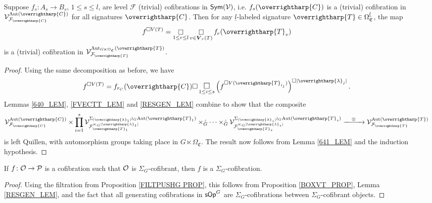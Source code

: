 \documentclass[a4paper,10pt
,draft
]{article}%
\renewcommand{\F}{\mathcal F}
\renewcommand{\1}{\eta}%
\newcommand{\vect}[1]{\text{\overrightharp{\ensuremath{#1}}}}
\begin{document}
\begin{proposition}
      \label{BOXVT_PROP}
      Suppose $f_s: A_s \to B_s$, $1 \leq s \leq l$, are level $\F$ (trivial) cofibrations in $\mathsf{Sym}(\mathcal V)$, i.e. $f_s(\vect C)$ is a (trivial) cofibration in $\V^{\Aut(\vect C)}_{\F_{\vect C}}$ for all signatures $\vect C$.
      Then for any $\underline{l}$-labeled signature $\vect T \in \Omega^{\underline{l}}_{\mathfrak C}$, the map
      \[
            f^{\square V(T)} = \mathop{\square}\limits_{1 \leq r \leq l} \mathop{\square}\limits_{v \in \boldsymbol{V}_r(T)} f_r(\vect T_v)
      \]
      is a (trivial) cofibration in $\V^{\Aut_{G \ltimes \Omega_{\mathfrak C}}(\vect T)}_{\F_{\vect T}}$.
\end{proposition}
\begin{proof}
      Using the same decomposition as before, we have
      \[
            f^{\square V(T)} = f_{r_C}(\vect C) \square \mathop{\mathlarger{\square}}\limits_{1 \leq i \leq s}\left(f^{\square V(\vect T_{i_j})}\right)^{\square |\vect \lambda_j|}.
      \]
      Lemmas \ref{640_LEM}, \ref{FVECTT_LEM} and \ref{RESGEN_LEM} combine to show that the composite
      \[
            \V^{\Aut(\vect C)}_{\F_{\vect C}} \times
            \prod_{i=1}^s
            \V^{\Sigma_{|\vect \lambda_1|} \wr_G \Aut(\vect T_1)}_{\F_{\vect T_1}^{\ltimes_G |\vect \lambda_1|}}
            \times_G^\lrcorner
            \dots
            \times_G^\lrcorner
            \V^{\Sigma_{|\vect \lambda_s|} \wr_G \Aut(\vect T_s)}_{\F_{\vect T_s}^{\ltimes_G |\vect \lambda_s|}}
            \xrightarrow{\quad \otimes \quad}
            \V^{\Aut(\vect T)}_{\F_{\vect T}}
      \]
      is left Quillen,
      with automorphism groups taking place in $G \ltimes \Omega_{\mathfrak C}$. 
      The result now follows from Lemma \ref{641_LEM} and the induction hypothesis.
\end{proof}


\begin{corollary}
      \label{SIGMAG_COF_COR}
      If $f \colon \mathcal{O} \to \mathcal{P}$ is a cofibration such that $\mathcal{O}$ is $\Sigma_G$-cofibrant, then $f$ is a $\Sigma_G$-cofibration.
\end{corollary}
\begin{proof}
      Using the filtration from Proposition \ref{FILTPUSHG PROP},
      this follows from Proposition \ref{BOXVT_PROP}, Lemma \ref{RESGEN_LEM}, and the fact that all generating cofibrations in $\mathsf{sOp}^G$ are $\Sigma_G$-cofibrations between $\Sigma_G$-cofibrant objects.
\end{proof}
\end{document}
